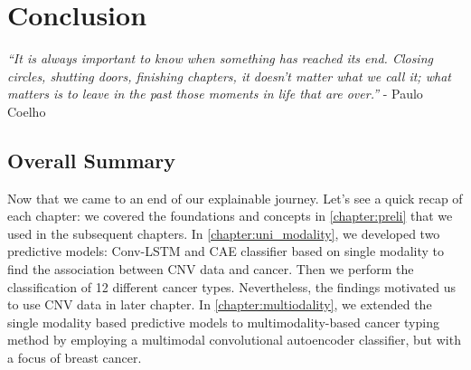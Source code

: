 \chapter{Conclusion}\label{chapter:end}
\textit{``It is always important to know when something has reached its end. Closing circles, shutting doors, finishing chapters, it doesn't matter what we call it; what matters is to leave in the past those moments in life that are over.''} - Paulo Coelho

\section{Overall Summary}
Now that we came to an end of our explainable journey. Let's see a quick recap of each chapter: we covered the foundations and concepts in \cref{chapter:preli} that we used in the subsequent chapters. In \cref{chapter:uni_modality}, we developed two predictive models: Conv-LSTM and CAE classifier based on single modality to find the association between CNV data and cancer. Then we perform the classification of 12 different cancer types. Nevertheless, the findings motivated us to use CNV data in later chapter. In \cref{chapter:multiodality}, we extended the single modality based predictive models to multimodality-based cancer typing method by employing a multimodal convolutional autoencoder classifier, but with a focus of breast cancer. 

